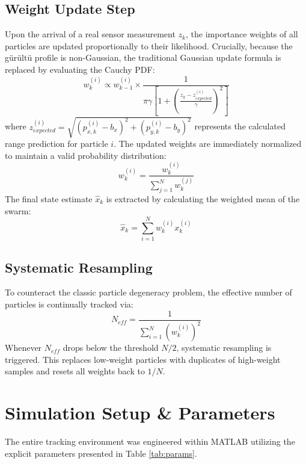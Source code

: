\documentclass[10pt,twocolumn,a4paper]{article}
\begin{document}
\subsection{Weight Update Step}
Upon the arrival of a real sensor measurement $z_k$, the importance weights of all particles are updated proportionally to their likelihood. Crucially, because the g\"ur\"ult\"u profile is non-Gaussian, the traditional Gaussian update formula is replaced by evaluating the Cauchy PDF:
\begin{equation}
    w_{k}^{(i)} \propto w_{k-1}^{(i)} \times \frac{1}{\pi \gamma \left[1 + \left(\frac{z_{k} - z_{expected}^{(i)}}{\gamma}\right)^{2}\right]}
\end{equation}
where $z_{expected}^{(i)} = \sqrt{(p_{x,k}^{(i)} - b_{x})^{2} + (p_{y,k}^{(i)} - b_{y})^{2}}$ represents the calculated range prediction for particle $i$. The updated weights are immediately normalized to maintain a valid probability distribution:
\begin{equation}
    w_{k}^{(i)} = \frac{w_{k}^{(i)}}{\sum_{j=1}^N w_{k}^{(j)}}
\end{equation}
The final state estimate $\hat{x}_k$ is extracted by calculating the weighted mean of the swarm:
\begin{equation}
    \hat{x}_k = \sum_{i=1}^N w_k^{(i)} x_k^{(i)}
\end{equation}

\subsection{Systematic Resampling}
To counteract the classic particle degeneracy problem, the effective number of particles is continually tracked via:
\begin{equation}
    N_{eff} = \frac{1}{\sum_{i=1}^N \left(w_k^{(i)}\right)^2}
\end{equation}
Whenever $N_{eff}$ drops below the threshold $N/2$, systematic resampling is triggered. This replaces low-weight particles with duplicates of high-weight samples and resets all weights back to $1/N$.

\section{Simulation Setup \& Parameters}
The entire tracking environment was engineered within MATLAB utilizing the explicit parameters presented in Table \ref{tab:params}.
\end{document}
